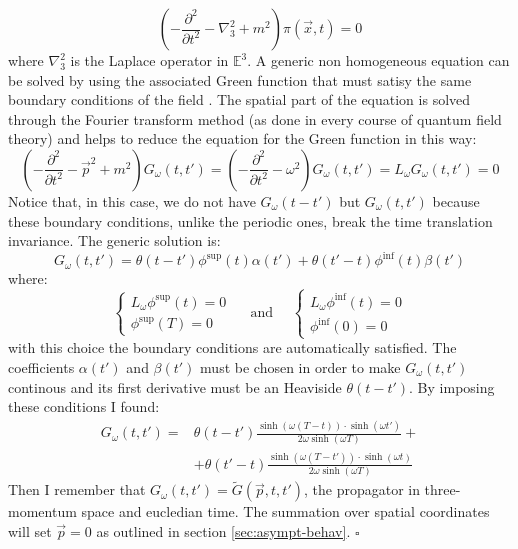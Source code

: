 \documentclass[english, LaM, oneside, noexaminfo]{sapthesis}
\newcommand{\proved}{\newline \hspace*{.97\textwidth} $\square$}
\begin{document}
\begin{equation*}
    \left(-\frac{\partial^2}{\partial t^2} - \nabla_3^2 + m^2 \right) \pi(\vec x,t) = 0
\end{equation*}
where $\nabla_3^2$ is the Laplace operator in $\mathbb{E}^3$.
A generic non homogeneous equation can be solved by using the associated Green function that must satisy the same boundary conditions of the field \cite{zaffaroni-pradisi}.
The spatial part of the equation is solved through the Fourier transform method (as done in every course of quantum field theory) and helps to reduce the equation for the Green function in this way:
\begin{equation*}
    \left(-\frac{\partial^2}{\partial t^2} - \vec p^2 + m^2 \right) G_\omega(t,t') = \left(-\frac{\partial^2}{\partial t^2} - \omega^2 \right) G_\omega(t,t') = L_\omega G_\omega(t,t') = 0
\end{equation*}
Notice that, in this case, we do not have $G_\omega(t-t')$ but $G_\omega(t,t')$ because these boundary conditions, unlike the periodic ones, break the time translation invariance.
The generic solution is:
\begin{equation*}
    G_\omega(t,t') = \theta (t-t')\phi^\text{sup}(t)\alpha (t') + \theta (t'-t) \phi^\text{inf}(t)\beta (t')
\end{equation*}
where:
\begin{equation*}
    \begin{cases}
        L_\omega \phi^\text{sup} (t) = 0 \\
        \phi^\text{sup} (T) = 0
    \end{cases}
    \quad \text{ and } \quad
    \begin{cases}
        L_\omega \phi^\text{inf} (t) = 0 \\
        \phi^\text{inf} (0) = 0
    \end{cases}
\end{equation*}
with this choice the boundary conditions are automatically satisfied.
The coefficients $\alpha (t')$ and $\beta (t')$ must be chosen in order to make $G_\omega(t,t')$ continous and its first derivative must be an Heaviside $\theta(t-t')$.
By imposing these conditions I found:
\begin{equation*}
    \begin{aligned}
        G_\omega (t,t') = & \theta (t-t') \frac{\sinh \left( \omega (T - t) \right) \cdot \sinh \left( \omega t' \right)}{2 \omega \sinh \left( \omega T \right)} + \\
                          & + \theta (t'-t) \frac{\sinh \left( \omega (T - t') \right) \cdot \sinh \left( \omega t \right)}{2 \omega \sinh \left( \omega T \right)}
    \end{aligned}
\end{equation*}
Then I remember that $G_\omega(t,t') = \tilde G(\vec p,t,t')$, the propagator in three-momentum space and eucledian time. The summation over spatial coordinates will set $\vec p=0$ as outlined in section \ref{sec:asympt-behav}.
\proved

\backmatter
{}
\printbibliography

\end{document}
